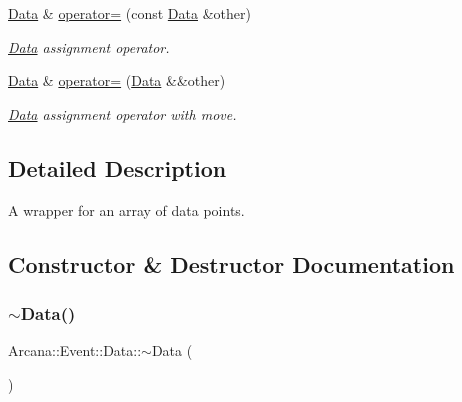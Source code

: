 \begin{DoxyCompactItemize}
\mbox{\label{class_arcana_1_1_event_1_1_data_ab1477f0496f6c5c3b66f8f1a67380b15}} 
\mbox{\hyperlink{class_arcana_1_1_event_1_1_data}{Data}} \& \mbox{\hyperlink{class_arcana_1_1_event_1_1_data_ab1477f0496f6c5c3b66f8f1a67380b15}{operator=}} (const \mbox{\hyperlink{class_arcana_1_1_event_1_1_data}{Data}} \&other)
\begin{DoxyCompactList}\small\item\em \mbox{\hyperlink{class_arcana_1_1_event_1_1_data}{Data}} assignment operator. \end{DoxyCompactList}\item 
\mbox{\label{class_arcana_1_1_event_1_1_data_a9158bd2be50e69e12c804b880c8acedb}} 
\mbox{\hyperlink{class_arcana_1_1_event_1_1_data}{Data}} \& \mbox{\hyperlink{class_arcana_1_1_event_1_1_data_a9158bd2be50e69e12c804b880c8acedb}{operator=}} (\mbox{\hyperlink{class_arcana_1_1_event_1_1_data}{Data}} \&\&other)
\begin{DoxyCompactList}\small\item\em \mbox{\hyperlink{class_arcana_1_1_event_1_1_data}{Data}} assignment operator with move. \end{DoxyCompactList}\end{DoxyCompactItemize}


\subsection{Detailed Description}
A wrapper for an array of data points. 

\subsection{Constructor \& Destructor Documentation}
\mbox{\label{class_arcana_1_1_event_1_1_data_a8076fa1e15aa67b9df4c8970bb92d2b9}} 
\subsubsection{\texorpdfstring{$\sim$\+Data()}{~Data()}}
{\footnotesize\ttfamily Arcana\+::\+Event\+::\+Data\+::$\sim$\+Data (\begin{DoxyParamCaption}{ }\end{DoxyParamCaption})}



